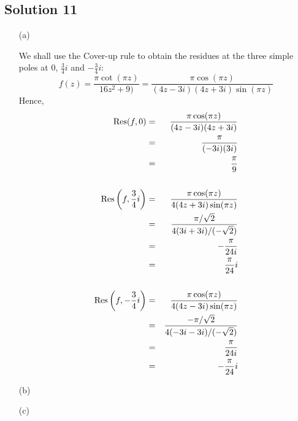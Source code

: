 \subsection*{Solution 11}

\begin{itemize}
\item[(a)]

We shall use the Cover-up rule to obtain the residues at
the three simple poles at $0$, $\frac{3}{4}i$ and $-\frac{3}{4}i$:
\[
f(z)	= \frac{ \pi\cot(\pi z) }{ 16z^2+9) }
	= \frac{ \pi \cos(\pi z) }{ (4z-3i)(4z+3i)\sin(\pi z) }
\]
Hence,
\begin{eqnarray*}
{\rm Res}(f,0)
	&=& \frac{ \pi \cos(\pi z) }{ (4z-3i)(4z+3i) } \\
	&=& \frac{ \pi }{ (-3i)(3i) } \\
	&=& \frac{ \pi }{ 9 } \\
\\
{\rm Res}\left(f,\frac{3}{4}i\right)
	&=& \frac{ \pi \cos(\pi z) }{ 4(4z+3i)\sin(\pi z) } \\
	&=& \frac{ \pi/\sqrt{2} }{ 4(3i+3i)/(-\sqrt{2}) } \\
	&=& -\frac{ \pi }{ 24i } \\
	&=& \frac{\pi}{24}i \\
\\
{\rm Res}\left(f,-\frac{3}{4}i\right)
	&=& \frac{ \pi \cos(\pi z) }{ 4(4z-3i)\sin(\pi z) } \\
	&=& \frac{ -\pi/\sqrt{2} }{ 4(-3i-3i)/(-\sqrt{2}) } \\
	&=& \frac{ \pi }{ 24i } \\
	&=& -\frac{\pi}{24}i
\end{eqnarray*}

\item[(b)]
\todo
\item[(c)]
\todo
\end{itemize}


